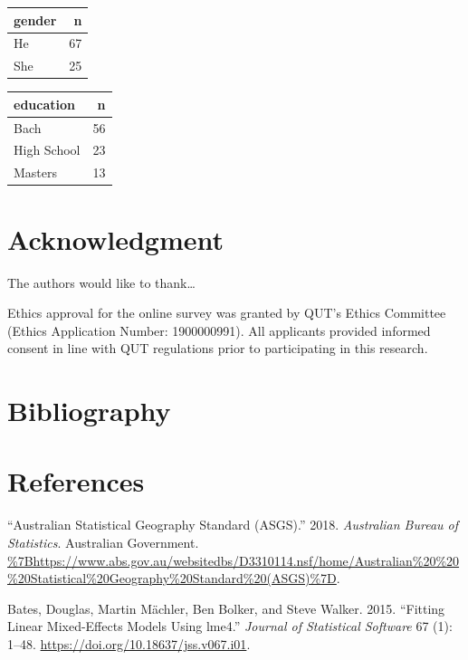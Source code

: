 \documentclass[conference,final,]{IEEEtran}
\begin{document}
\begin{tabular}{lr}
\toprule
gender & n\\
\midrule
He & 67\\
She & 25\\
\bottomrule
\end{tabular}

\begin{tabular}{lr}
\toprule
education & n\\
\midrule
Bach & 56\\
High School & 23\\
Masters & 13\\
\bottomrule
\end{tabular}

\hypertarget{acknowledgment}{%
\section{Acknowledgment}\label{acknowledgment}}

The authors would like to thank\ldots{}

Ethics approval for the online survey was granted by QUT's Ethics
Committee (Ethics Application Number: 1900000991). All applicants
provided informed consent in line with QUT regulations prior to
participating in this research.

\hypertarget{bibliography}{%
\section{Bibliography}\label{bibliography}}

\newpage

\hypertarget{references}{%
\section{References}\label{references}}

\hypertarget{refs}{}
\leavevmode\hypertarget{ref-abs2016}{}%
``Australian Statistical Geography Standard (ASGS).'' 2018.
\emph{Australian Bureau of Statistics}. Australian Government.
\url{\%7Bhttps://www.abs.gov.au/websitedbs/D3310114.nsf/home/Australian\%20\%20\%20Statistical\%20Geography\%20Standard\%20(ASGS)\%7D}.

\leavevmode\hypertarget{ref-lme4}{}%
Bates, Douglas, Martin Mächler, Ben Bolker, and Steve Walker. 2015.
``Fitting Linear Mixed-Effects Models Using lme4.'' \emph{Journal of
Statistical Software} 67 (1): 1--48.
\url{https://doi.org/10.18637/jss.v067.i01}.
\end{document}
